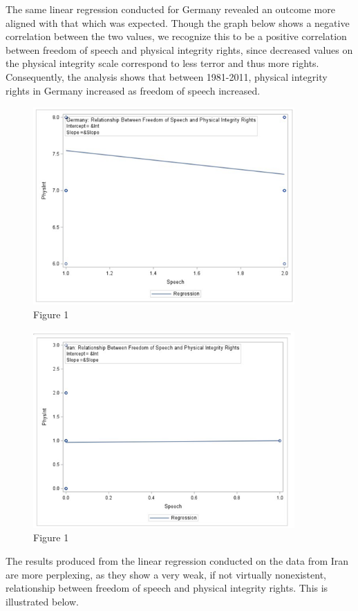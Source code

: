 \documentclass{article}
\begin{document}
The same linear regression conducted for Germany revealed an outcome more aligned with that which was expected. Though the graph below shows a negative correlation between the two values, we recognize this to be a positive correlation between freedom of speech and physical integrity rights, since decreased values on the physical integrity scale correspond to less terror and thus more rights. Consequently, the analysis shows that between 1981-2011, physical integrity rights in Germany increased as freedom of speech increased.

\begin{figure}[htp]
    \centering
    \includegraphics[width=10cm]{Germany.png}
    \caption{Figure 1}
    \label{fig:Germany}
\end{figure}

\begin{figure}[htp]
    \centering
    \includegraphics[width=10cm]{Iran.png}
    \caption{Figure 1}
    \label{fig:Iran}
\end{figure}

The results produced from the linear regression conducted on the data from Iran are more perplexing, as they show a very weak, if not virtually nonexistent, relationship between freedom of speech and physical integrity rights. This is illustrated below.
\end{document}
